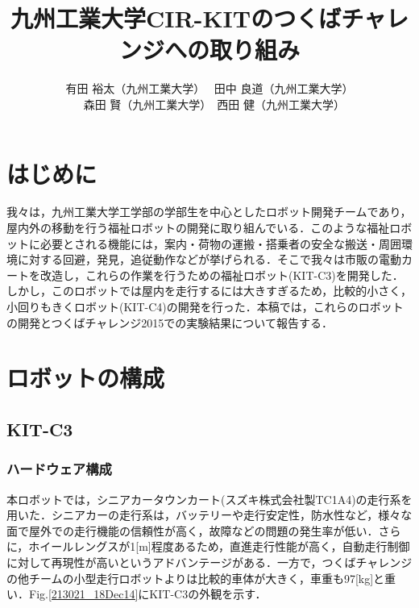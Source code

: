 \documentclass[10pt,a4paper]{jarticle}
\begin{document}
\title{\fontsize{16pt}{0pt}\selectfont 九州工業大学CIR-KITのつくばチャレンジへの取り組み}
\author{\fontsize{12pt}{0pt} 有田 裕太（九州工業大学）~ 田中 良道（九州工業大学） \\ ~ 森田 賢（九州工業大学）~西田 健（九州工業大学）}
\engtitle{
   \fontsize{16pt}{40pt}\selectfont 
}

\abstract{
\fontsize{9pt}{0pt}\selectfont
}

\maketitle\thispagestyle{empty}
\pagestyle{empty}

\section{はじめに}
\label{sec:intro}
我々は，九州工業大学工学部の学部生を中心としたロボット開発チームであり，屋内外の移動を行う福祉ロボットの開発に取り組んでいる．このような福祉ロボットに必要とされる機能には，案内・荷物の運搬・搭乗者の安全な搬送・周囲環境に対する回避，発見，追従動作などが挙げられる．そこで我々は市販の電動カートを改造し，これらの作業を行うための福祉ロボット(KIT-C3)を開発した．しかし，このロボットでは屋内を走行するには大きすぎるため，比較的小さく，小回りもきくロボット(KIT-C4)の開発を行った．本稿では，これらのロボットの開発とつくばチャレンジ2015での実験結果について報告する．

\section{ロボットの構成}
\subsection{KIT-C3}
\subsubsection{ハードウェア構成}
本ロボットでは，シニアカータウンカート(スズキ株式会社製TC1A4)の走行系を用いた．シニアカーの走行系は，バッテリーや走行安定性，防水性など，様々な面で屋外での走行機能の信頼性が高く，故障などの問題の発生率が低い．さらに，ホイールレングスが1[m]程度あるため，直進走行性能が高く，自動走行制御に対して再現性が高いというアドバンテージがある．一方で，つくばチャレンジの他チームの小型走行ロボットよりは比較的車体が大きく，車重も97[kg]と重い．Fig.\ref{213021_18Dec14}にKIT-C3の外観を示す．
\end{document}
